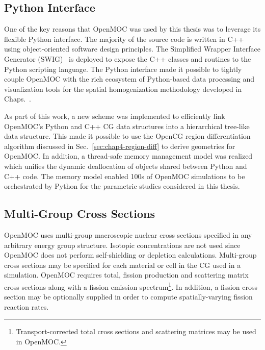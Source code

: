 \subsection{Python Interface}
\label{subsubsec:chap4-openmoc-python}

One of the key reasons that OpenMOC was used by this thesis was to leverage its flexible Python interface. The majority of the source code is written in C++ using object-oriented software design principles. The Simplified Wrapper Interface Generator (SWIG)~\cite{beazley2003swig} is deployed to expose the C++ classes and routines to the Python scripting language. The Python interface made it possible to tightly couple OpenMOC with the rich ecosystem of Python-based data processing and visualization tools for the spatial homogenization methodology developed in Chaps.~.

As part of this work, a new scheme was implemented to efficiently link OpenMOC's Python and C++ \ac{CG} data structures into a hierarchical tree-like data structure. This made it possible to use the OpenCG region differentiation algorithm discussed in Sec.~\ref{sec:chap4-region-diff} to derive geometries for OpenMOC. In addition, a thread-safe memory management model was realized which unifies the dynamic deallocation of objects shared between Python and C++ code. The memory model enabled 100s of OpenMOC simulations to be orchestrated by Python for the parametric studies considered in this thesis.


\subsection{Multi-Group Cross Sections}
\label{subsubsec:chap4-openmoc-mgxs}

OpenMOC uses multi-group macroscopic nuclear cross sections specified in any arbitrary energy group structure. Isotopic concentrations are not used since OpenMOC does not perform self-shielding or depletion calculations. Multi-group cross sections may be specified for each material or cell in the \ac{CG} used in a simulation. OpenMOC requires total, fission production and scattering matrix cross sections along with a fission emission spectrum\footnote{Transport-corrected total cross sections and scattering matrices may be used in OpenMOC.}. In addition, a fission cross section may be optionally supplied in order to compute spatially-varying fission reaction rates.

